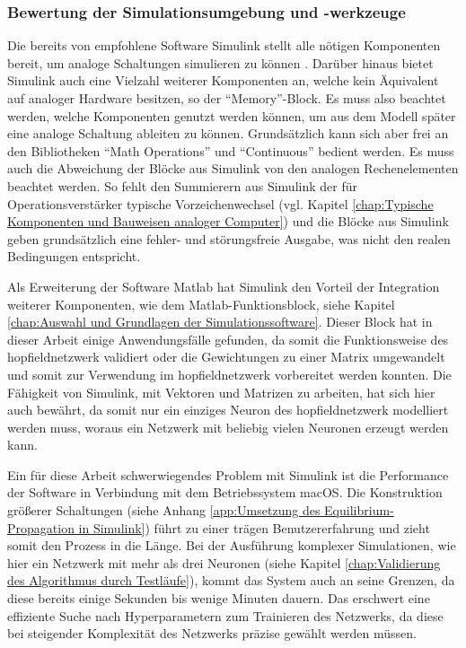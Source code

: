 \subsubsection{Bewertung der Simulationsumgebung und -werkzeuge}
\label{chap:Bewertung der Simulationsumgebung und -werkzeuge}

Die bereits von \citeauthor{Ulmann2022} empfohlene Software Simulink stellt alle nötigen Komponenten bereit, um analoge Schaltungen simulieren zu können \cite[vgl. S. 240]{Ulmann2022}. Darüber hinaus bietet Simulink auch eine Vielzahl weiterer Komponenten an, welche kein Äquivalent auf analoger Hardware besitzen, so \zb der "`Memory"'-Block. Es muss also beachtet werden, welche Komponenten genutzt werden können, um aus dem Modell später eine analoge Schaltung ableiten zu können. Grundsätzlich kann sich aber frei an den Bibliotheken "`Math Operations"' und "`Continuous"' bedient werden. Es muss auch die Abweichung der Blöcke aus Simulink von den analogen Rechenelementen beachtet werden. So fehlt \zb den Summierern aus Simulink der für Operationsverstärker typische Vorzeichenwechsel (vgl. Kapitel \ref{chap:Typische Komponenten und Bauweisen analoger Computer}) und die Blöcke aus Simulink geben grundsätzlich eine fehler- und störungsfreie Ausgabe, was nicht den realen Bedingungen entspricht.

Als Erweiterung der Software Matlab hat Simulink den Vorteil der Integration weiterer Komponenten, wie dem Matlab-Funktionsblock, siehe Kapitel \ref{chap:Auswahl und Grundlagen der Simulationssoftware}. Dieser Block hat in dieser Arbeit einige Anwendungsfälle gefunden, da somit \zb die Funktionsweise des \gls{hopfieldnetzwerk} validiert oder die Gewichtungen zu einer Matrix umgewandelt und somit zur Verwendung im \gls{hopfieldnetzwerk} vorbereitet werden konnten. Die Fähigkeit von Simulink, mit Vektoren und Matrizen zu arbeiten, hat sich hier auch bewährt, da somit nur ein einziges Neuron des \gls{hopfieldnetzwerk} modelliert werden muss, woraus ein Netzwerk mit beliebig vielen Neuronen erzeugt werden kann.

Ein für diese Arbeit schwerwiegendes Problem mit Simulink ist die Performance der Software in Verbindung mit dem Betriebssystem macOS. Die Konstruktion größerer Schaltungen (siehe \zb Anhang \ref{app:Umsetzung des Equilibrium-Propagation in Simulink}) führt zu einer trägen Benutzererfahrung und zieht somit den Prozess in die Länge. Bei der Ausführung komplexer Simulationen, wie hier ein Netzwerk mit mehr als drei Neuronen (siehe Kapitel \ref{chap:Validierung des Algorithmus durch Testläufe}), kommt das System auch an seine Grenzen, da diese bereits einige Sekunden bis wenige Minuten dauern. Das erschwert \zb eine effiziente Suche nach Hyperparametern zum Trainieren des Netzwerks, da diese bei steigender Komplexität des Netzwerks präzise gewählt werden müssen.
